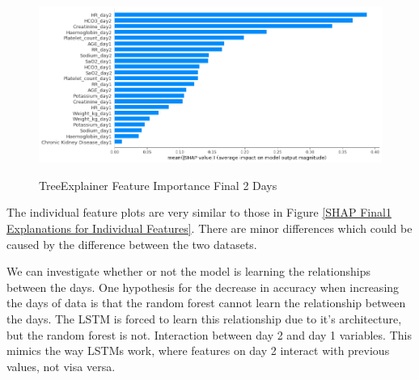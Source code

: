 \documentclass[12pt]{article}
\begin{document}
\begin{figure}[H]
\centering\caption{TreeExplainer Feature Importance Final 2 Days}
\includegraphics[scale=0.45]{TreeExplainer Final2/TreeExplainer Final2 Feature Importance.png}
\label{TreeExplainer Feature Importance Final 2 Days}
\end{figure}

The individual feature plots are very similar to those in Figure \ref{SHAP Final1 Explanations for Individual Features}. There are minor differences which could be caused by the difference between the two datasets. 

We can investigate whether or not the model is learning the relationships between the days. One hypothesis for the decrease in accuracy when increasing the days of data is that the random forest cannot learn the relationship between the days. The LSTM is forced to learn this relationship due to it's architecture, but the random forest is not. Interaction between day 2 and day 1 variables. This mimics the way LSTMs work, where features on day 2 interact with previous values, not visa versa.
\end{document}
